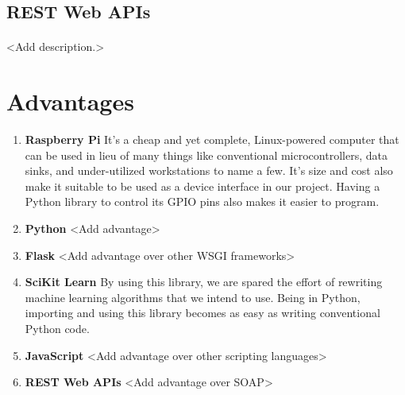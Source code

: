 \subsection{REST Web APIs}
\paragraph{}
<Add description.>


\section{Advantages}

\begin{enumerate}

\begin{comment}
\item \textbf{Machine Learning}
It is central to the functioning of any system that is based on learning complex models that often change dynamically, thus rendering hard coding of such models difficult if not impossible. Machine learning overcomes this hurdle by analyzing the model and trying to detect any patterns in it. Any changes in the pattern can also be detected by the system and the system can respond to it suitably.
\end{comment}

\item \textbf{Raspberry Pi}
It's a cheap and yet complete, Linux-powered computer that can be used in lieu of many things like conventional microcontrollers, data sinks, and under-utilized workstations to name a few. It's size and cost also make it suitable to be used as a device interface in our project. Having a Python library to control its GPIO pins also makes it easier to program.

\item \textbf{Python}
<Add advantage>

\item \textbf{Flask}
<Add advantage over other WSGI frameworks>

\item \textbf{SciKit Learn}
By using this library, we are spared the effort of rewriting machine learning algorithms that we intend to use. Being in Python, importing and using this library becomes as easy as writing conventional Python code.

\item \textbf{JavaScript}
<Add advantage over other scripting languages>

\item \textbf{REST Web APIs}
<Add advantage over SOAP>
\end{enumerate}

